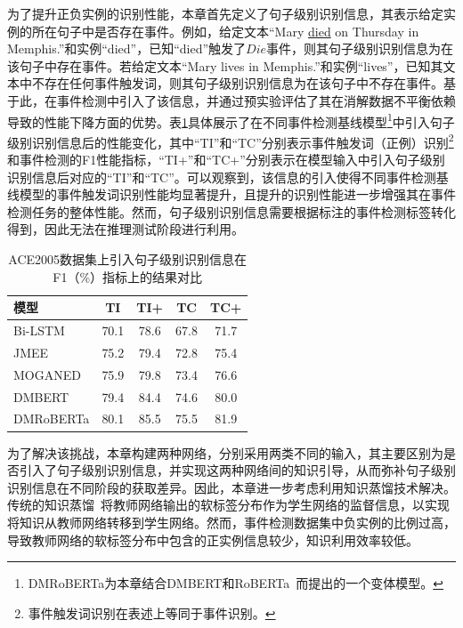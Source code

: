 为了提升正负实例的识别性能，本章首先定义了句子级别识别信息，其表示给定实例的所在句子中是否存在事件。例如，给定文本“Mary \underline{died} on Thursday in Memphis.”和实例“died”，已知“died”触发了$Die$事件，则其句子级别识别信息为在该句子中存在事件。若给定文本“Mary lives in Memphis.”和实例“lives”，已知其文本中不存在任何事件触发词，则其句子级别识别信息为在该句子中不存在事件。基于此，在事件检测中引入了该信息，并通过预实验评估了其在消解数据不平衡依赖导致的性能下降方面的优势。表\ref{tab:gap_event}具体展示了在不同事件检测基线模型\footnote{DMRoBERTa为本章结合DMBERT和RoBERTa~\cite{liu2019roberta}而提出的一个变体模型。}中引入句子级别识别信息后的性能变化，其中“TI”和“TC”分别表示事件触发词（正例）识别\footnote{事件触发词识别在表述上等同于事件识别。}和事件检测的F1性能指标，“TI+”和“TC+”分别表示在模型输入中引入句子级别识别信息后对应的“TI”和“TC”。可以观察到，该信息的引入使得不同事件检测基线模型的事件触发词识别性能均显著提升，且提升的识别性能进一步增强其在事件检测任务的整体性能。然而，句子级别识别信息需要根据标注的事件检测标签转化得到，因此无法在推理测试阶段进行利用。

\begin{table}[htp]
\centering
\caption{ACE2005数据集上引入句子级别识别信息在F1（\%）指标上的结果对比}
\begin{tabular}{l|cccc}
\toprule
模型  & TI   & TI+  & TC   & TC+  \\ \midrule
Bi-LSTM~\cite{hochreiter1997long} & 70.1 & 78.6 & 67.8 & 71.7 \\
JMEE~\cite{liu2018jointly}    & 75.2 & 79.4 & 72.8 & 75.4 \\
MOGANED~\cite{yan2019event} & 75.9 & 79.8 & 73.4 & 76.6 \\
DMBERT~\cite{wang2019adversarial} & 79.4 & 84.4 & 74.6 & 80.0 \\ 
DMRoBERTa & 80.1 & 85.5 & 75.5 & 81.9 \\ \bottomrule
\end{tabular}
\label{tab:gap_event}
\end{table}

为了解决该挑战，本章构建两种网络，分别采用两类不同的输入，其主要区别为是否引入了句子级别识别信息，并实现这两种网络间的知识引导，从而弥补句子级别识别信息在不同阶段的获取差异。因此，本章进一步考虑利用知识蒸馏技术解决。传统的知识蒸馏~\cite{hinton2015distilling}将教师网络输出的软标签分布作为学生网络的监督信息，以实现将知识从教师网络转移到学生网络。然而，事件检测数据集中负实例的比例过高，导致教师网络的软标签分布中包含的正实例信息较少，知识利用效率较低。

